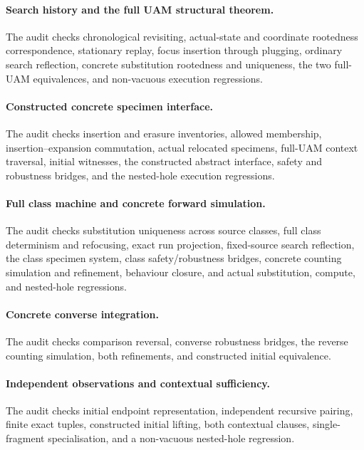 \paragraph{Search history and the full UAM structural theorem.}
The audit checks chronological revisiting, actual-state and coordinate
rootedness correspondence, stationary replay, focus insertion through plugging,
ordinary search reflection, concrete substitution rootedness and uniqueness,
the two full-UAM equivalences, and non-vacuous execution regressions.

\paragraph{Constructed concrete specimen interface.}
The audit checks insertion and erasure inventories, allowed membership,
insertion--expansion commutation, actual relocated specimens, full-UAM
context traversal, initial witnesses, the constructed abstract interface,
safety and robustness bridges, and the nested-hole execution regressions.

\paragraph{Full class machine and concrete forward simulation.}
The audit checks substitution uniqueness across source classes, full class
determinism and refocusing, exact run projection, fixed-source search
reflection, the class specimen system, class safety/robustness bridges,
concrete counting simulation and refinement, behaviour closure, and actual
substitution, compute, and nested-hole regressions.

\paragraph{Concrete converse integration.}
The audit checks comparison reversal, converse robustness bridges, the reverse
counting simulation, both refinements, and constructed initial equivalence.

\paragraph{Independent observations and contextual sufficiency.}
The audit checks initial endpoint representation, independent recursive pairing,
finite exact tuples, constructed initial lifting, both contextual clauses,
single-fragment specialisation, and a non-vacuous nested-hole regression.

